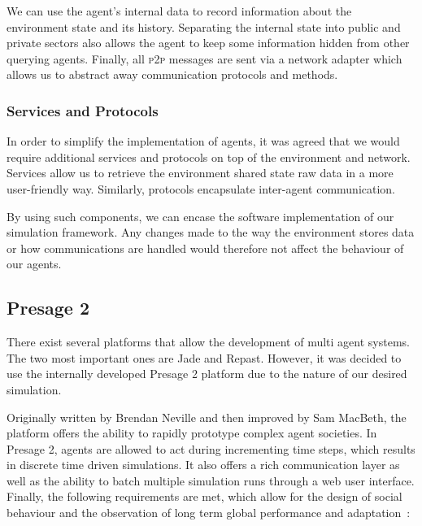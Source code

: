 We can use the agent's internal data to record information about the environment state and its history. Separating the internal state into public and private sectors also allows the agent to keep some information hidden from other querying agents. Finally, all \textsc{p2p} messages are sent via a network adapter which allows us to abstract away communication protocols and methods.

\subsubsection{Services and Protocols}

In order to simplify the implementation of agents, it was agreed that we would require additional services and protocols on top of the environment and network. Services allow us to retrieve the environment shared state raw data in a more user-friendly way. Similarly, protocols encapsulate inter-agent communication.

By using such components, we can encase the software implementation of our simulation framework. Any changes made to the way the environment stores data or how communications are handled would therefore not affect the behaviour of our agents.

\subsection{Presage 2}

There exist several platforms that allow the development of multi agent systems. The two most important ones are Jade and Repast. However, it was decided to use the internally developed Presage 2 platform due to the nature of our desired simulation.

Originally written by Brendan Neville and then improved by Sam MacBeth, the platform offers the ability to rapidly prototype complex agent societies. In Presage 2, agents are allowed to act during incrementing time steps, which results in discrete time driven simulations. It also offers a rich communication layer as well as the ability to batch multiple simulation runs through a web user interface. Finally, the following requirements are met, which allow for the design of social behaviour and the observation of long term global performance and adaptation~\cite{Presage2-agent-societies}:

